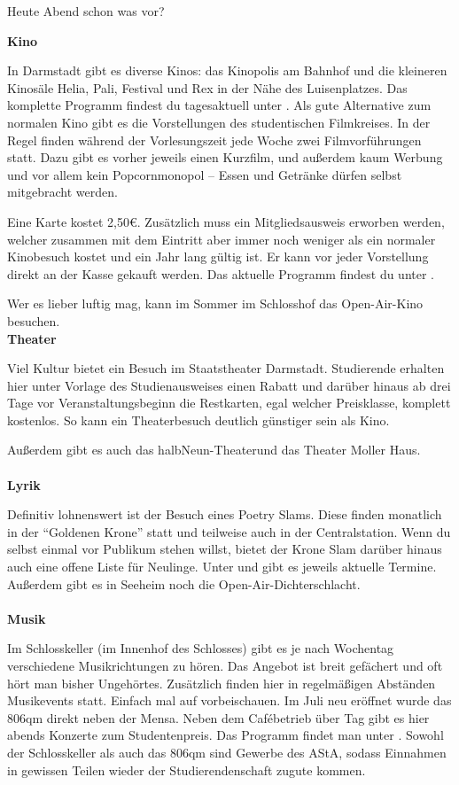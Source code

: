 {Heute Abend schon was vor?
}{
\textbf{Kino}

In Darmstadt gibt es diverse Kinos: das Kinopolis am Bahnhof und die kleineren Kinosäle Helia, Pali, Festival und Rex in der Nähe des Luisenplatzes. Das komplette Programm findest du tagesaktuell unter  \footnotemark[1].
Als gute Alternative zum normalen Kino gibt es die Vorstellungen des studentischen Filmkreises. In der Regel finden während der Vorlesungszeit jede Woche zwei Filmvorführungen statt. Dazu gibt es vorher jeweils einen Kurzfilm, und außerdem kaum Werbung und vor allem kein Popcornmonopol – Essen und Getränke dürfen selbst mitgebracht werden.

Eine Karte kostet 2,50\euro. Zusätzlich muss ein Mitgliedsausweis erworben werden, welcher zusammen mit dem Eintritt aber immer noch weniger als ein normaler Kinobesuch kostet und ein Jahr lang gültig ist. Er kann vor jeder Vorstellung direkt an der Kasse gekauft werden. Das aktuelle Programm findest du unter \footnotemark[2].

Wer es lieber luftig mag, kann im Sommer im Schlosshof das Open-Air-Kino besuchen.\\

\textbf{Theater}

Viel Kultur bietet ein Besuch im Staatstheater Darmstadt. Studierende erhalten hier unter Vorlage des Studienausweises einen Rabatt und darüber hinaus ab drei Tage vor Veranstaltungsbeginn die Restkarten, egal welcher Preisklasse, komplett kostenlos. So kann ein Theaterbesuch deutlich günstiger sein als Kino.

Außerdem gibt es auch das halbNeun-Theater\footnotemark[3] und das Theater Moller Haus\footnotemark[4].
\\\\
\textbf{Lyrik}

Definitiv lohnenswert ist der Besuch eines Poetry Slams. Diese finden monatlich in der "`Goldenen Krone"' statt und teilweise auch in der Centralstation. Wenn du selbst einmal vor Publikum stehen willst, bietet der Krone Slam darüber hinaus auch eine offene Liste für Neulinge.
Unter \footnotemark[5] und \footnotemark[6] gibt es jeweils aktuelle Termine. Außerdem gibt es in Seeheim noch die Open-Air-Dichterschlacht.
\\\\
\textbf{Musik}

Im Schlosskeller (im Innenhof des Schlosses) gibt es je nach Wochentag verschiedene Musikrichtungen zu hören. Das Angebot ist breit gefächert und oft hört man bisher Ungehörtes. Zusätzlich finden hier in regelmäßigen Abständen Musikevents statt. Einfach mal auf \footnotemark[7] vorbeischauen.
Im Juli neu eröffnet wurde das 806qm direkt neben der Mensa. Neben dem Caf\'ebetrieb über Tag gibt es hier abends Konzerte zum Studentenpreis. Das Programm findet man unter \footnotemark[8].
Sowohl der Schlosskeller als auch das 806qm sind Gewerbe des AStA, sodass Einnahmen in gewissen Teilen wieder der Studierendenschaft zugute kommen.

}
